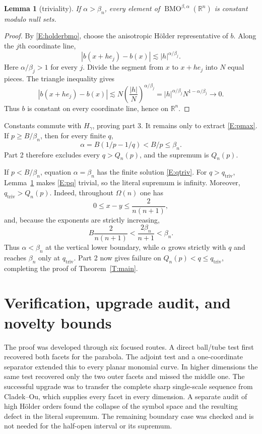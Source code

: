 \documentclass[11pt]{article}
\newtheorem{lemma}[theorem]{Lemma}
\newcommand{\R}{\mathbb R}
\newcommand{\BMO}{\operatorname{BMO}}
\begin{document}
\begin{lemma}[triviality]\label{L:trivial}
If $\alpha>\beta_n$, every element of
$\BMO^{\beta,\alpha}(\R^n)$ is constant modulo null sets.
\end{lemma}

\begin{proof}
By \eqref{E:holderbmo}, choose the anisotropic Hölder representative of $b$.
Along the $j$th coordinate line,
\[
 |b(x+he_j)-b(x)|\lesssim |h|^{\alpha/\beta_j}.
\]
Here $\alpha/\beta_j>1$ for every $j$.  Divide the segment from $x$ to
$x+he_j$ into $N$ equal pieces.  The triangle inequality gives
\[
 |b(x+he_j)-b(x)|
 \lesssim N\left(\frac{|h|}{N}\right)^{\alpha/\beta_j}
 =|h|^{\alpha/\beta_j}N^{1-\alpha/\beta_j}\longrightarrow0.
\]
Thus $b$ is constant on every coordinate line, hence on $\R^n$.
\end{proof}

Constants commute with $H_\gamma$, proving part 3.  It remains only to
extract \eqref{E:pmax}.  If $p\ge B/\beta_n$, then for every finite $q$,
\[
 \alpha=B(1/p-1/q)<B/p\le\beta_n.
\]
Part 2 therefore excludes every $q>Q_n(p)$, and the supremum is $Q_n(p)$.

If $p<B/\beta_n$, equation $\alpha=\beta_n$ has the finite solution
\eqref{E:qtriv}.  For $q>q_{\mathrm{triv}}$, Lemma~\ref{L:trivial} makes
\eqref{E:pq} trivial, so the literal supremum is infinity.  Moreover,
$q_{\mathrm{triv}}>Q_n(p)$.  Indeed, throughout $\Omega(n)$ one has
\[
 0\le x-y\le\frac{2}{n(n+1)},
\]
and, because the exponents are strictly increasing,
\[
 B\frac{2}{n(n+1)}<\frac{2\beta_n}{n+1}<\beta_n.
\]
Thus $\alpha<\beta_n$ at the vertical lower boundary, while $\alpha$ grows
strictly with $q$ and reaches $\beta_n$ only at $q_{\mathrm{triv}}$.
Part 2 now gives failure on
$Q_n(p)<q\le q_{\mathrm{triv}}$, completing the proof of
Theorem~\ref{T:main}.

\section{Verification, upgrade audit, and novelty bounds}

The proof was developed through six focused routes.  A direct ball/tube test
first recovered both facets for the parabola.  The adjoint test and a
one-coordinate separator extended this to every planar monomial curve.  In
higher dimensions the same test recovered only the two outer facets and
missed the middle one.  The successful upgrade was to transfer the complete
sharp single-scale sequence from Cladek--Ou, which supplies every facet in
every dimension.  A separate audit of high Hölder orders found the collapse
of the symbol space and the resulting defect in the literal supremum.  The
remaining boundary case was checked and is not needed for the half-open
interval or its supremum.
\end{document}
